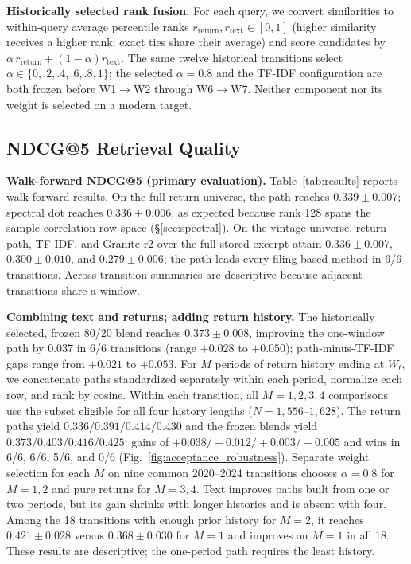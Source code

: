 \documentclass[sigconf,anonymous]{acmart}
\begin{document}
\textbf{Historically selected rank fusion.}
For each query, we convert similarities to within-query average percentile ranks
$r_{\mathrm{return}},r_{\mathrm{text}}\in[0,1]$ (higher similarity receives a
higher rank; exact ties share their average) and score candidates by
$\alpha\,r_{\mathrm{return}}+(1-\alpha)r_{\mathrm{text}}$.
The same twelve historical transitions select
$\alpha\in\{0,.2,.4,.6,.8,1\}$; the selected $\alpha=0.8$ and the TF-IDF
configuration are both frozen before W1$\to$W2 through W6$\to$W7.
Neither component nor its weight is selected on a modern target.

\subsection{NDCG@5 Retrieval Quality}
\label{sec:ndcg}

\textbf{Walk-forward NDCG@5 (primary evaluation).}
Table~\ref{tab:results} reports walk-forward results.  On the full-return
universe, the path reaches $0.339\pm0.007$; spectral dot reaches
$0.336\pm0.006$, as expected because rank 128 spans the sample-correlation row
space (\S\ref{sec:spectral}).  On the vintage universe, return path, TF-IDF, and
Granite-r2 over the full stored excerpt attain $0.336\pm0.007$,
$0.300\pm0.010$, and $0.279\pm0.006$; the path leads every filing-based method in 6/6
transitions.  Across-transition summaries are descriptive because adjacent
transitions share a window.

\textbf{Combining text and returns; adding return history.}
The historically selected, frozen 80/20 blend reaches $0.373\pm0.008$,
improving the one-window path by $0.037$ in 6/6 transitions (range
$+0.028$ to $+0.050$); path-minus-TF-IDF gaps range from $+0.021$ to $+0.053$.
For $M$ periods of return history ending at $W_t$, we concatenate paths
standardized separately within each period, normalize each row, and rank by
cosine.  Within each transition, all $M=1,2,3,4$ comparisons use the subset
eligible for all four history lengths
($N=1{,}556$--$1{,}628$).  The return paths yield
$0.336/0.391/0.414/0.430$ and the frozen blends yield
$0.373/0.403/0.416/0.425$: gains of $+0.038/+0.012/+0.003/-0.005$ and wins in
6/6, 6/6, 5/6, and 0/6 (Fig.~\ref{fig:acceptance_robustness}).  Separate weight
selection for each $M$ on nine common 2020--2024 transitions chooses
$\alpha=0.8$ for $M=1,2$ and pure returns for $M=3,4$.
Text improves paths built from one or two periods, but its gain shrinks with
longer histories and is absent with four.
Among the 18 transitions with enough prior history for $M=2$, it reaches
$0.421\pm0.028$ versus $0.368\pm0.030$ for $M=1$ and improves on $M=1$ in all
18.  These results are descriptive; the one-period path requires the least
history.
\end{document}
